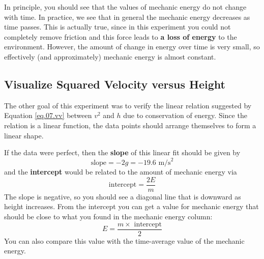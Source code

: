 In principle, you should see that the values of mechanic energy do not change with time. In practice, we see that in general the mechanic energy decreases as time passes. This is actually true, since in this experiment you could not completely remove friction and this force leads to \textbf{a loss of energy} to the environment. However, the amount of change in energy over time is very small, so effectively (and approximately) mechanic energy is almost constant.
\subsection{Visualize Squared Velocity versus Height}
The other goal of this experiment was to verify the linear relation suggested by Equation \ref{eq.07.vv} between $v^{2}$ and $h$ due to conservation of energy. Since the relation is a linear function, the data points should arrange themselves to form a linear shape.

If the data were perfect, then the \textbf{slope} of this linear fit should be given by
\begin{equation} \label{eq.07.slope}
    \text{slope} = -2g = -19.6 \text{ m/s}^{2}
\end{equation}
and the \textbf{intercept} would be related to the amount of mechanic energy via
\begin{equation}
    \text{intercept} = \frac{2 E}{m}
\end{equation}
The slope is negative, so you should see a diagonal line that is downward as height increases. From the intercept you can get a value for mechanic energy that should be close to what you found in the mechanic energy column:
\begin{equation} \label{eq.07.intercept}
    E = \frac{m \times \text{ intercept}}{2}
\end{equation}
You can also compare this value with the time-average value of the mechanic energy.
